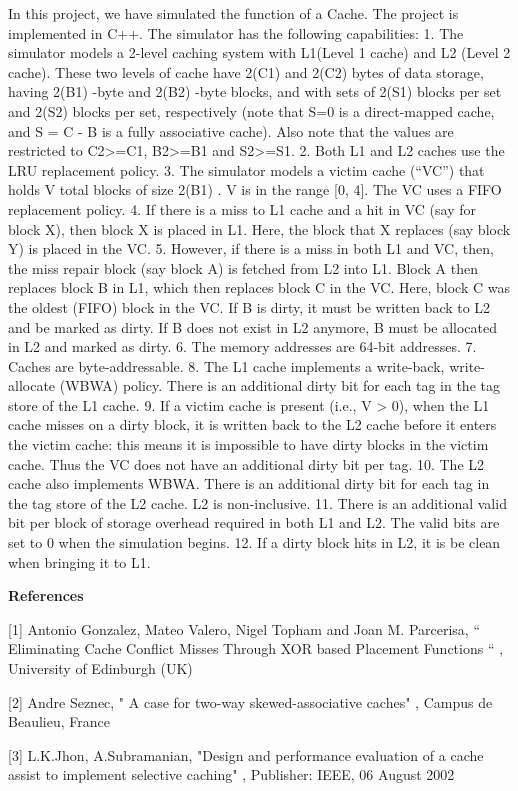 \documentclass [ 12pt, letterpaper, twoside] {article}
\begin{document}
In this project, we have simulated the function of a Cache. The project is implemented in C++. The simulator has the following capabilities:
    1. The simulator models a 2-level caching system with L1(Level 1 cache) and L2 (Level 2 cache). These two levels of cache have 2(C1) and 2(C2) bytes of data storage, having 2(B1) -byte and 2(B2) -byte blocks, and with sets of 2(S1) blocks per set and 2(S2) blocks per set, respectively (note that S=0 is a direct-mapped cache, and S = C - B is a fully associative cache). Also note that the values are restricted to C2>=C1, B2>=B1 and S2>=S1. 
    2. Both L1 and L2 caches use the LRU replacement policy. 
    3. The simulator models a victim cache (“VC”) that holds V total blocks of size 2(B1) . V is in the range [0, 4]. The VC uses a FIFO replacement policy. 
    4. If there is a miss to L1 cache and a hit in VC (say for block X), then block X is placed in L1. Here, the block that X replaces (say block Y) is placed in the VC. 
    5. However, if there is a miss in both L1 and VC, then, the miss repair block (say block A) is fetched from L2 into L1. Block A then replaces block B in L1, which then replaces block C in the VC. Here, block C was the oldest (FIFO) block in the VC. If B is dirty, it must be written back to L2 and be marked as dirty. If B does not exist in L2 anymore, B must be allocated in L2 and marked as dirty. 
    6. The memory addresses are 64-bit addresses. 
    7. Caches are byte-addressable. 
    8. The L1 cache implements a write-back, write-allocate (WBWA) policy. There is an additional dirty bit for each tag in the tag store of the L1 cache. 
    9. If a victim cache is present (i.e., V > 0), when the L1 cache misses on a dirty block, it is written back to the L2 cache before it enters the victim cache: this means it is impossible to have dirty blocks in the victim cache. Thus the VC does not have an additional dirty bit per tag. 
    10. The L2 cache also implements WBWA. There is an additional dirty bit for each tag in the tag store of the L2 cache. L2 is non-inclusive. 
    11. There is an additional valid bit per block of storage overhead required in both L1 and L2. The valid bits are set to 0 when the simulation begins. 
    12. If a dirty block hits in L2, it is be clean when bringing it to L1. 

\textbf{\large References}

[1]   Antonio Gonzalez, Mateo Valero, Nigel Topham and Joan M. Parcerisa, “ Eliminating Cache Conflict Misses Through XOR based Placement Functions “ , University of Edinburgh (UK)

[2]    Andre Seznec, " A case for two-way skewed-associative caches" , Campus de Beaulieu, France

[3]     L.K.Jhon, A.Subramanian, "Design and performance evaluation of a cache assist to implement selective caching" , Publisher: IEEE, 06 August 2002
\end{document}
